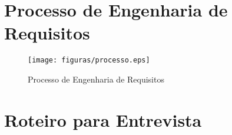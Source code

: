 \begin{anexosenv}

\partanexos

\chapter{Processo de Engenharia de Requisitos}
\label{annex:processo}

\begin{figure}[!h]
        \centering
        \texttt{[image: figuras/processo.eps]}
        \caption{Processo de Engenharia de Requisitos}
\end{figure}


\chapter{Roteiro para Entrevista}
\label{annex:roteiro}

\end{anexosenv}
